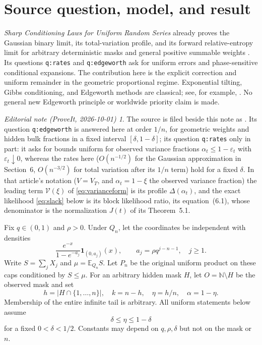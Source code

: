 \documentclass[11pt,a4paper]{article}
\theoremstyle{remark}\newtheorem*{ednote}{Editorial note (ProveIt, 2026-10-01)}
\newcommand{\E}{\mathbb E}\newcommand{\R}{\mathbb R}\newcommand{\TV}{\operatorname{TV}}
\newcommand{\ind}{\mathbf1}\newcommand{\dd}{\,\mathrm d}\newcommand{\ph}{\varphi}
\begin{document}
\section{Source question, model, and result}
\emph{Sharp Conditioning Laws for Uniform Random Series} already proves the Gaussian binary limit, its total-variation profile, and its forward relative-entropy limit for arbitrary deterministic masks and general positive summable weights \cite{Repository}. Its questions \texttt{q:rates} and \texttt{q:edgeworth} ask for uniform errors and phase-sensitive conditional expansions. The contribution here is the explicit correction and uniform remainder in the geometric proportional regime. Exponential tilting, Gibbs conditioning, and Edgeworth methods are classical; see, for example, \cite{DZ}. No general new Edgeworth principle or worldwide priority claim is made.
\begin{ednote}
The source \cite{Repository} is filed beside this note as
. Its question
\texttt{q:edgeworth} is answered here at order $1/n$, for geometric weights
and hidden bulk fractions in a fixed interval $[\delta,1-\delta]$; its
question \texttt{q:rates} only in part: it asks for bounds uniform for
observed variance fractions $\alpha_t\le1-\varepsilon_t$ with
$\varepsilon_t\downarrow0$, whereas the rates here ($O(n^{-1/2})$ for the
Gaussian approximation in Section~6, $O(n^{-3/2})$ for total variation after
its $1/n$ term) hold for a fixed $\delta$. In that article's notation ($V=V_T$,
and $\alpha_t=1-\xi$ the observed variance fraction) the leading term
$\mathcal V(\xi)$ of \eqref{eq:varianceform} is its profile $\Delta(\alpha_t)$,
and the exact likelihood \eqref{eq:slack} below is its block likelihood
ratio, its equation~(6.1), whose denominator is the normalization $J(t)$ of
its Theorem~5.1.
\end{ednote}

Fix $q\in(0,1)$ and $\rho>0$. Under $Q_n$, let the coordinates be independent with densities
\begin{equation}\label{eq:coordinates}
 \frac{e^{-x}}{1-e^{-a_j}}\ind_{(0,a_j)}(x),
 \qquad a_j=\rho q^{j-n-1},\quad j\ge1.
\end{equation}
Write $S=\sum_jX_j$ and $\mu=\E_{Q_n}S$. Let $P_n$ be the original uniform product on these caps conditioned by $S\le\mu$. For an arbitrary hidden mask $H$, let $O=\mathbb N\setminus H$ be the observed mask and set
\[
 h=|H\cap\{1,\ldots,n\}|,\quad k=n-h,\quad
 \eta=h/n,\quad\alpha=1-\eta.
\]
Membership of the entire infinite tail is arbitrary. All uniform statements below assume
\begin{equation}\label{eq:interior}
 \delta\le\eta\le1-\delta
\end{equation}
for a fixed $0<\delta<1/2$. Constants may depend on $q,\rho,\delta$ but not on the mask or $n$.
\end{document}
